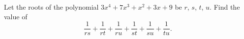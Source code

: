 Let the roots of the polynomial $3x^4+7x^3+x^2+3x+9$ be $r$, $s$, $t$, $u$. Find the value of
\[\dfrac{1}{rs}+\dfrac{1}{rt}+\dfrac{1}{ru}+\dfrac{1}{st}+\dfrac{1}{su}+\dfrac{1}{tu}.\]
